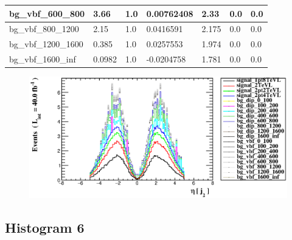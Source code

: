 \documentclass[a4paper, 10pt]{article}
\begin{document}
\begin{table}[H]
\begin{center}
\begin{tabular}{|m{23.0mm}|m{23.0mm}|m{18.0mm}|m{19.0mm}|m{19.0mm}|m{19.0mm}|m{19.0mm}|}
      \hline
      {\cellcolor{white}         bg\_vbf\_600\_800}& {\cellcolor{white}         3.66}& {\cellcolor{white}         1.0}& {\cellcolor{white}         0.00762408}& {\cellcolor{white}         2.33}& {\cellcolor{green}         0.0}& {\cellcolor{green}         0.0}\\
      \hline
      {\cellcolor{white}         bg\_vbf\_800\_1200}& {\cellcolor{white}         2.15}& {\cellcolor{white}         1.0}& {\cellcolor{white}         0.0416591}& {\cellcolor{white}         2.175}& {\cellcolor{green}         0.0}& {\cellcolor{green}         0.0}\\
      \hline
      {\cellcolor{white}         bg\_vbf\_1200\_1600}& {\cellcolor{white}         0.385}& {\cellcolor{white}         1.0}& {\cellcolor{white}         0.0257553}& {\cellcolor{white}         1.974}& {\cellcolor{green}         0.0}& {\cellcolor{green}         0.0}\\
      \hline
      {\cellcolor{white}         bg\_vbf\_1600\_inf}& {\cellcolor{white}         0.0982}& {\cellcolor{white}         1.0}& {\cellcolor{white}         -0.0204758}& {\cellcolor{white}         1.781}& {\cellcolor{green}         0.0}& {\cellcolor{green}         0.0}\\
\hline
    \end{tabular}
  \end{center}
\end{table}

\begin{figure}[H]
  \begin{center}
    \includegraphics[scale=0.45]{selection_4.eps}\\
\caption{   }
  \end{center}
\end{figure}
      \newpage
\subsection{ Histogram 6}
\end{document}
